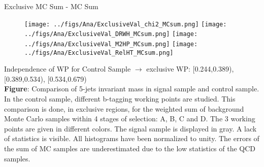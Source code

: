 \begin{frame}{Exclusive MC Sum - MC Sum}
\vspace{-.2cm}
\begin{figure}[!Hhtbp]
  \begin{center}
    \texttt{[image: ../figs/Ana/ExclusiveVal\_chi2\_MCsum.png]}
    \texttt{[image: ../figs/Ana/ExclusiveVal\_DRWH\_MCsum.png]}
    \texttt{[image: ../figs/Ana/ExclusiveVal\_M2HP\_MCsum.png]}
    \texttt{[image: ../figs/Ana/ExclusiveVal\_RelHT\_MCsum.png]}
  \end{center}
\end{figure}

\vspace{-.2cm}
    \begin{block}{}\tiny
      Independence of WP for Control Sample $\to$ exclusive WP: [0.244,0.389), [0.389,0.534), [0.534,0.679)\\
      \textbf{Figure}: Comparison of 5-jets invariant mass in signal sample and control sample. In the control sample, different b-tagging working points are studied. This comparison is done, in exclusive regions, for the weighted sum of background Monte Carlo samples within 4 stages of selection: A, B, C and D. The 3 working points are given in different colors. The signal sample is displayed in gray. A lack of statistics is visible. All histograms have been normalized to unity. The errors of the sum of MC samples are underestimated due to the low statistics of the QCD samples.
    \end{block}

\end{frame}


